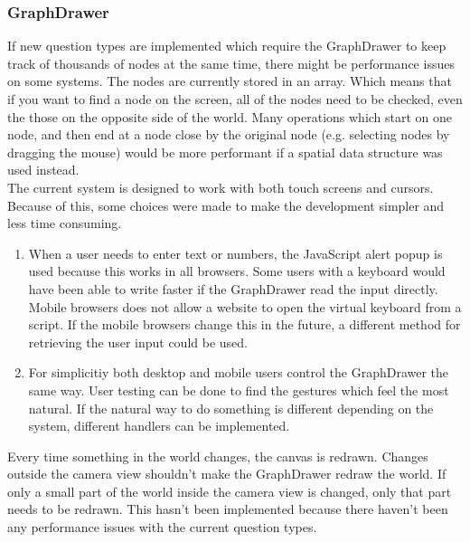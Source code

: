 \subsubsection{GraphDrawer}
If new question types are implemented which require the GraphDrawer to keep track of thousands of nodes at the same time, there might be performance issues on some systems. The nodes are currently stored in an array. Which means that if you want to find a node on the screen, all of the nodes need to be checked, even the those on the opposite side of the world. Many operations which start on one node, and then end at a node close by the original node (e.g. selecting nodes by dragging the mouse) would be more performant if a spatial data structure\cite{SpatialDatastructure} was used instead.
\\[11pt]
The current system is designed to work with both touch screens and cursors. Because of this, some choices were made to make the development simpler and less time consuming.
\begin{enumerate}
    \item When a user needs to enter text or numbers, the JavaScript alert popup is used because this works in all browsers. Some users with a keyboard would have been able to write faster if the GraphDrawer read the input directly. Mobile browsers does not allow a website to open the virtual keyboard from a script. If the mobile browsers change this in the future, a different method for retrieving the user input could be used.
    \item For simplicitiy both desktop and mobile users control the GraphDrawer the same way. User testing can be done to find the gestures which feel the most natural. If the natural way to do something is different depending on the system, different handlers can be implemented.
\end{enumerate}
Every time something in the world changes, the canvas is redrawn. Changes outside the camera view shouldn't make the GraphDrawer redraw the world. If only a small part of the world inside the camera view is changed, only that part needs to be redrawn. This hasn't been implemented because there haven't been any performance issues with the current question types.